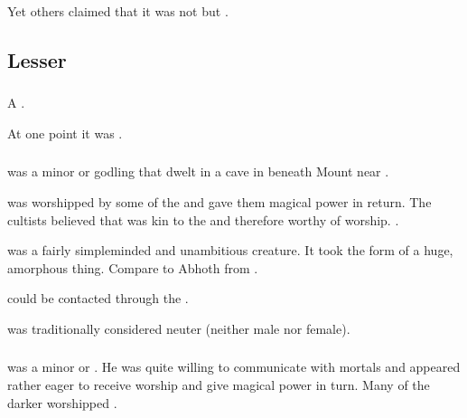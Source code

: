 Yet others claimed that it was not \RuinSatha but . 













\subsection{Lesser \XzaiShanns}





\subsubsection{\HothNrul}
\index{\HothNrul}
A \theraton. 

At one point it was . 





\subsubsection{\Ubloth}
\index{\Ubloth}
\Ubloth was a minor \xs or \theraton godling that dwelt in a cave in  beneath Mount  near . 

\Ubloth was worshipped by some of the  and gave them magical power in return. 
The \Ubloth cultists believed that \Ubloth was kin to the \Ortaican {} and therefore worthy of worship.
. 

\Ubloth was a fairly simpleminded and unambitious creature.
It took the form of a huge, amorphous thing. 
Compare to Abhoth from \cite{ClarkAshtonSmith:TheSevenGeases}.

\Ubloth could be contacted through the . 

\Ubloth was traditionally considered neuter (neither male nor female). 





\subsubsection{\Yolbaoth}
\index{\Yolbaoth}
\Yolbaoth was a minor \xs or \theraton. 
He was quite willing to communicate with mortals and appeared rather eager to receive worship and give magical power in turn. 
Many of the darker  worshipped \Yolbaoth. 


